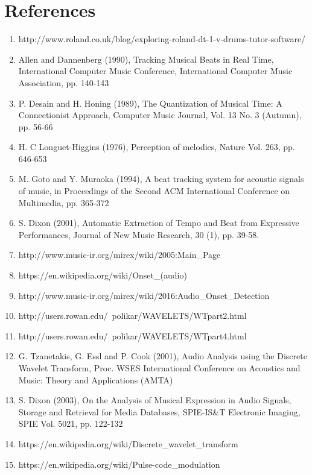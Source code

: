 \documentclass[a4paper, 11pt]{article}
\begin{document}
\maketitle{} 
\section{References}
\begin{enumerate}
\item http://www.roland.co.uk/blog/exploring-roland-dt-1-v-drums-tutor-software/
\item Allen and Dannenberg (1990), Tracking Musical Beats in Real Time, International Computer Music Conference, International Computer Music Association, pp. 140-143
\item P. Desain and H. Honing (1989), The Quantization of Musical Time: A Connectionist Approach, Computer Music Journal, Vol. 13 No. 3 (Autumn), pp. 56-66
\item H. C Longuet-Higgins (1976), Perception of melodies, Nature Vol. 263, pp. 646-653
\item M. Goto and Y. Muraoka (1994), A beat tracking system for acoustic signals of music, in Proceedings of the Second ACM International Conference on Multimedia, pp. 365-372
\item S. Dixon (2001), Automatic Extraction of Tempo and Beat from Expressive Performances, Journal of New Music Research, 30 (1), pp. 39-58.
\item http://www.music-ir.org/mirex/wiki/2005:Main\_Page
\item https://en.wikipedia.org/wiki/Onset\_(audio)
\item http://www.music-ir.org/mirex/wiki/2016:Audio\_Onset\_Detection
\item http://users.rowan.edu/~polikar/WAVELETS/WTpart2.html
\item http://users.rowan.edu/~polikar/WAVELETS/WTpart4.html
\item G. Tzanetakis, G. Essl and P. Cook (2001), Audio Analysis using the Discrete Wavelet Transform, Proc. WSES International Conference on Acoustics and Music: Theory and Applications (AMTA)
\item S. Dixon (2003), On the Analysis of Musical Expression in Audio Signals, Storage and Retrieval for Media Databases, SPIE-IS\&T Electronic Imaging, SPIE Vol. 5021, pp. 122-132
\item https://en.wikipedia.org/wiki/Discrete\_wavelet\_transform
\item https://en.wikipedia.org/wiki/Pulse-code\_modulation

\end{enumerate}
\end{document}
